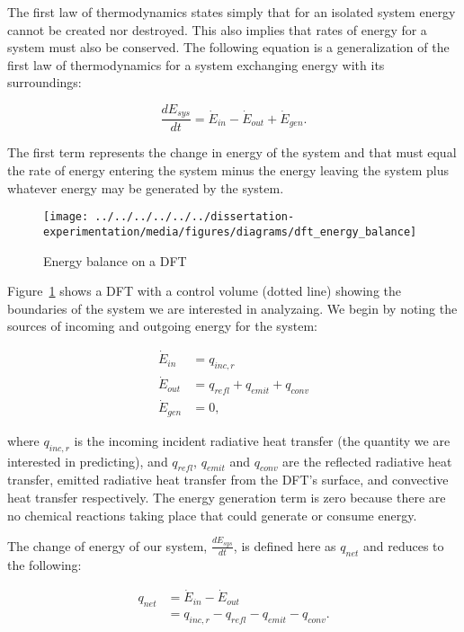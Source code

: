 \documentclass[article]{proc}
\begin{document}
    The first law of thermodynamics states simply that for an isolated system energy cannot be created nor destroyed. This also implies that rates of energy for a system must also be conserved. The following equation is a generalization of the first law of thermodynamics for a system exchanging energy with its surroundings:

    \begin{equation}\label{eq:energy_stored}
        \frac{dE_{sys}}{dt} = \dot{E}_{in} - \dot{E}_{out} + \dot{E}_{gen}.
    \end{equation}

    \noindent The first term represents the change in energy of the system and that must equal the rate of energy entering the system minus the energy leaving the system plus whatever energy may be generated by the system. 

    \begin{figure}[h!]
        \centering
        \texttt{[image: ../../../../../../dissertation-experimentation/media/figures/diagrams/dft\_energy\_balance]}
        \caption{Energy balance on a DFT}
        \label{fig:dft_energy}
    \end{figure}

    Figure~\ref{fig:dft_energy} shows a DFT with a control volume (dotted line) showing the boundaries of the system we are interested in analyzaing. We begin by noting the sources of incoming and outgoing energy for the system:

    \begin{align}\label{eq:dft_balance}
        \dot{E}_{in} &= q_{inc,r} \\
        \dot{E}_{out} &= q_{refl} + q_{emit} + q_{conv} \\
        \dot{E}_{gen} & = 0,
    \end{align}

    \noindent where $q_{inc,r}$ is the incoming incident radiative heat transfer (the quantity we are interested in predicting), and $q_{refl}$, $q_{emit}$ and $q_{conv}$ are the reflected radiative heat transfer, emitted radiative heat transfer from the DFT's surface, and convective heat transfer respectively. The energy generation term is zero because there are no chemical reactions taking place that could generate or consume energy.

    The change of energy of our system, $\frac{dE_{sys}}{dt}$, is defined here as $q_{net}$ and reduces to the following:

    \begin{align}\label{eq:q_net}
        q_{net} &= \dot{E}_{in} - \dot{E}_{out} \\
            &= q_{inc,r} - q_{refl} - q_{emit} - q_{conv}.
    \end{align}
\end{document}
